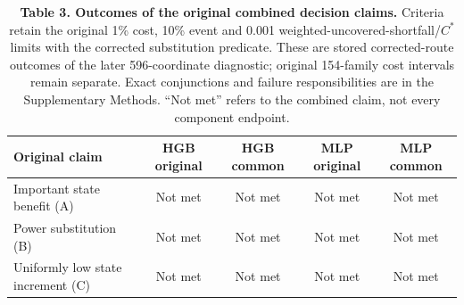 \begin{table}[H]
\centering
\caption*{\textbf{Table 3. Outcomes of the original combined decision claims.} Criteria retain the original 1\% cost, 10\% event and 0.001 weighted-uncovered-shortfall/$C^*$ limits with the corrected substitution predicate. These are stored corrected-route outcomes of the later 596-coordinate diagnostic; original 154-family cost intervals remain separate. Exact conjunctions and failure responsibilities are in the Supplementary Methods. ``Not met'' refers to the combined claim, not every component endpoint.}
\small
\begin{tabular}{lcccc}
\toprule
Original claim & HGB original & HGB common & MLP original & MLP common \\
\midrule
Important state benefit (A) & Not met & Not met & Not met & Not met \\
Power substitution (B) & Not met & Not met & Not met & Not met \\
Uniformly low state increment (C) & Not met & Not met & Not met & Not met \\
\bottomrule
\end{tabular}
\end{table}
